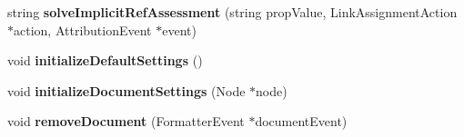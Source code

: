 \begin{CompactItemize}
\item 
string \textbf{solveImplicitRefAssessment} (string propValue, LinkAssignmentAction $\ast$action, AttributionEvent $\ast$event)\label{classbr_1_1pucrio_1_1telemidia_1_1ginga_1_1ncl_1_1FormatterScheduler_9a6d1cf6b5dd4d68d30e9b2df901d597}

\item 
void \textbf{initializeDefaultSettings} ()\label{classbr_1_1pucrio_1_1telemidia_1_1ginga_1_1ncl_1_1FormatterScheduler_a04cf268fa4a284bc6c827f3886896a2}

\item 
void \textbf{initializeDocumentSettings} (Node $\ast$node)\label{classbr_1_1pucrio_1_1telemidia_1_1ginga_1_1ncl_1_1FormatterScheduler_2950eaaa76f2bce16c9917d38d10bd61}

\item 
void \textbf{removeDocument} (FormatterEvent $\ast$documentEvent)\label{classbr_1_1pucrio_1_1telemidia_1_1ginga_1_1ncl_1_1FormatterScheduler_81a30c280aac17c437d9d6211f93984d}

\end{CompactItemize}
